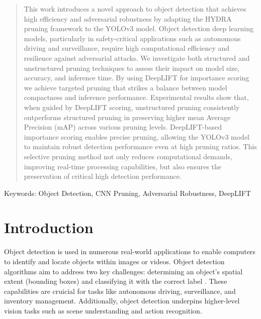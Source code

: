 \documentclass[10pt]{cai}
\begin{document}
\begin{abstract}

This work introduces a novel approach to object detection that achieves high efficiency and adversarial robustness by adapting the HYDRA pruning framework to the YOLOv3 model. Object detection deep learning models, particularly in safety-critical applications such as autonomous driving and surveillance, require high computational efficiency and resilience against adversarial attacks. We investigate both structured and unstructured pruning techniques to assess their impact on model size, accuracy, and inference time. By using DeepLIFT for importance scoring we achieve targeted pruning that strikes a balance between model compactness and inference performance. Experimental results show that, when guided by DeepLIFT scoring, unstructured pruning consistently outperforms structured pruning in preserving higher mean Average Precision (mAP) across various pruning levels. DeepLIFT-based importance scoring enables precise pruning, allowing the YOLOv3 model to maintain robust detection performance even at high pruning ratios. This selective pruning method not only reduces computational demands, improving real-time processing capabilities, but also ensures the preservation of critical high detection performance.
\end{abstract}

\begin{keywords}{Keywords:}
Object Detection, CNN Pruning, Adversarial Robustness, DeepLIFT
\end{keywords}
\copyrightnotice


\section{Introduction}
Object detection is used in numerous real-world applications to enable computers to identify and locate objects within images or videos. Object detection algorithms aim to address two key challenges: determining an object's spatial extent (bounding boxes) and classifying it with the correct label \cite{zhao2019objectdetectiondeeplearning}. These capabilities are cruicial for tasks like autonomous driving, surveillance, and inventory management. Additionally, object detection underpins higher-level vision tasks such as scene understanding and action recognition.
\end{document}

